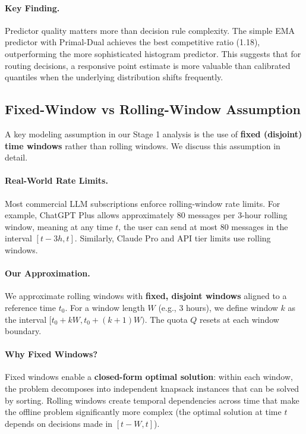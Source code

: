 \paragraph{Key Finding.} Predictor quality matters more than decision rule complexity. The simple EMA predictor with Primal-Dual achieves the best competitive ratio (1.18), outperforming the more sophisticated histogram predictor. This suggests that for routing decisions, a responsive point estimate is more valuable than calibrated quantiles when the underlying distribution shifts frequently.

\subsection{Fixed-Window vs Rolling-Window Assumption}
\label{app:window}

A key modeling assumption in our Stage 1 analysis is the use of \textbf{fixed (disjoint) time windows} rather than rolling windows. We discuss this assumption in detail.

\paragraph{Real-World Rate Limits.}
Most commercial LLM subscriptions enforce rolling-window rate limits. For example, ChatGPT Plus allows approximately 80 messages per 3-hour rolling window, meaning at any time $t$, the user can send at most 80 messages in the interval $[t-3h, t]$. Similarly, Claude Pro and API tier limits use rolling windows.

\paragraph{Our Approximation.}
We approximate rolling windows with \textbf{fixed, disjoint windows} aligned to a reference time $t_0$. For a window length $W$ (e.g., 3 hours), we define window $k$ as the interval $[t_0 + kW, t_0 + (k+1)W)$. The quota $Q$ resets at each window boundary.

\paragraph{Why Fixed Windows?}
Fixed windows enable a \textbf{closed-form optimal solution}: within each window, the problem decomposes into independent knapsack instances that can be solved by sorting. Rolling windows create temporal dependencies across time that make the offline problem significantly more complex (the optimal solution at time $t$ depends on decisions made in $[t-W, t]$).

